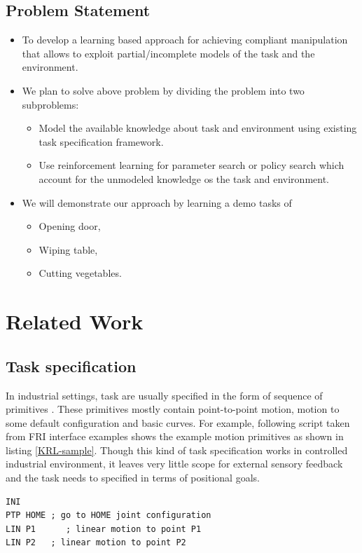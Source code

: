 \documentclass[thesis]{mas_proposal}
\begin{document}
\section{Problem Statement}
\begin{itemize}
	\item To develop a learning based approach for achieving compliant manipulation that allows to exploit partial/incomplete models
	of the task and the environment.
	\item We plan to solve above problem by dividing the problem into two subproblems:
	\begin{itemize}
		\item Model the available knowledge about task and environment using existing task specification framework.
		\item Use reinforcement learning for parameter search or policy search which account for the unmodeled knowledge os the task and environment.
	\end{itemize}
    \item We will demonstrate our approach by learning a demo tasks of 
    \begin{itemize}
    	\item Opening door,
    	\item Wiping table,
    	\item Cutting vegetables.
    \end{itemize}
\end{itemize}


\chapter{Related Work}
\section{Task specification}
In industrial settings, task are usually specified in the form of sequence of primitives \cite{leidner2017cognitive}. These primitives mostly contain point-to-point motion, motion to some default configuration and basic curves. For example, following script taken from FRI interface examples shows the example motion primitives as shown in listing \ref{KRL-sample}. Though this kind of task specification works in controlled industrial environment, it leaves very little scope for external sensory feedback and the task needs to specified in terms of positional goals.

\begin{lstlisting}[label=KRL-sample,caption=KUKA Robot Language code]
INI
PTP HOME ; go to HOME joint configuration
LIN P1      ; linear motion to point P1
LIN P2	 ; linear motion to point P2
\end{lstlisting}
\end{document}
